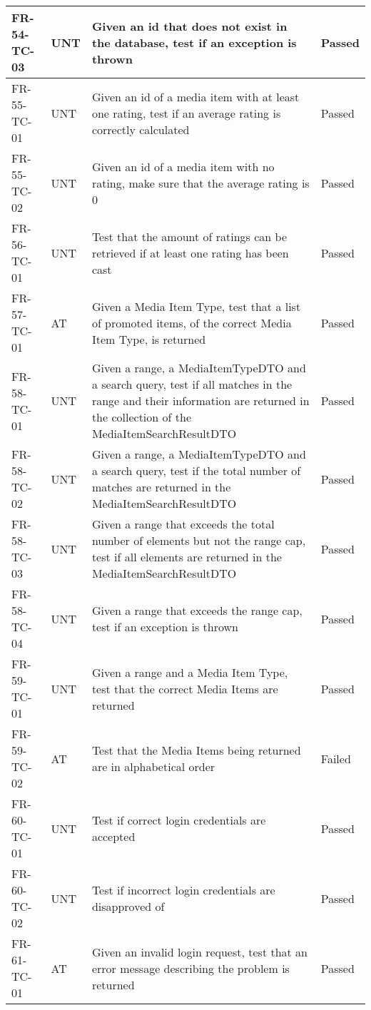 \documentclass[../report.tex]{subfiles}
\begin{document}
\begin{longtable}{|L{2.1cm}|L{1cm}|L{12.4cm}|L{1.4cm}|}
FR-54-TC-03&UNT&Given an id that does not exist in the database, test if an exception is thrown&Passed  \\ \hline
FR-55-TC-01&UNT&Given an id of a media item with at least one rating, test if an average rating is correctly calculated &Passed  \\ \hline
FR-55-TC-02&UNT&Given an id of a media item with no rating, make sure that the average rating is 0&Passed  \\ \hline
FR-56-TC-01&UNT&Test that the amount of ratings can be retrieved if at least one rating has been cast&Passed  \\ \hline
FR-57-TC-01&AT&Given a Media Item Type, test that a list of promoted items, of the correct Media Item Type, is returned&Passed  \\ \hline
FR-58-TC-01&UNT&Given a range, a MediaItemTypeDTO and a search query, test if all matches in the range and their information are returned in the collection of the MediaItemSearchResultDTO&Passed  \\ \hline
FR-58-TC-02&UNT&Given a range, a MediaItemTypeDTO and a search query, test if the total number of matches are returned in the MediaItemSearchResultDTO&Passed  \\ \hline
FR-58-TC-03&UNT&Given a range that exceeds the total number of elements but not the range cap, test if all elements are returned in the MediaItemSearchResultDTO&Passed  \\ \hline
FR-58-TC-04&UNT&Given a range that exceeds the range cap, test if an exception is thrown&Passed  \\ \hline
FR-59-TC-01&UNT&Given a range and a Media Item Type,  test that the correct Media Items are returned&Passed  \\ \hline
FR-59-TC-02&AT&Test that the Media Items being returned are in alphabetical order&Failed  \\ \hline
FR-60-TC-01&UNT&Test if correct login credentials are accepted&Passed  \\ \hline
FR-60-TC-02&UNT&Test if incorrect login credentials are disapproved of&Passed  \\ \hline
FR-61-TC-01&AT&Given an invalid login request, test that an error message describing the problem is returned&Passed  \\ \hline

\end{longtable}
\end{document}

